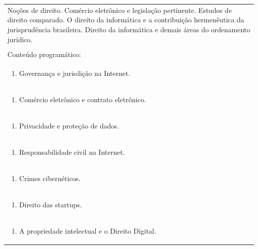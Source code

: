 \documentclass[11pt]{article}
\begin{document}
\begin{center}
\begin{longtable}{|p{4cm}|p{4cm}|p{4cm}|p{4cm}|}
\multicolumn{4}{|p{\dimexpr 16cm + 6\tabcolsep\relax}|}{Noções de direito. Comércio eletrônico e legislação pertinente. Estudos de direito comparado. O direito da informática e a contribuição hermenêutica da jurisprudência brasileira. Direito da informática e demais áreas do ordenamento jurídico.}\\
\multicolumn{4}{|p{16cm}|}{}\\
\hline
\multicolumn{4}{|p{16cm}|}{Conteúdo programático:}\\*
\multicolumn{4}{|p{\dimexpr 16cm + 6\tabcolsep\relax}|}{\begin{enumerate}[start=1]\item Governança e jurisdição na Internet.\end{enumerate}}\\
\multicolumn{4}{|p{\dimexpr 16cm + 6\tabcolsep\relax}|}{\begin{enumerate}[start=2]\item Comércio eletrônico e contrato eletrônico.\end{enumerate}}\\
\multicolumn{4}{|p{\dimexpr 16cm + 6\tabcolsep\relax}|}{\begin{enumerate}[start=3]\item Privacidade e proteção de dados.\end{enumerate}}\\
\multicolumn{4}{|p{\dimexpr 16cm + 6\tabcolsep\relax}|}{\begin{enumerate}[start=4]\item Responsabilidade civil na Internet.\end{enumerate}}\\
\multicolumn{4}{|p{\dimexpr 16cm + 6\tabcolsep\relax}|}{\begin{enumerate}[start=5]\item Crimes cibernéticos.\end{enumerate}}\\
\multicolumn{4}{|p{\dimexpr 16cm + 6\tabcolsep\relax}|}{\begin{enumerate}[start=6]\item Direito das startups.\end{enumerate}}\\
\multicolumn{4}{|p{\dimexpr 16cm + 6\tabcolsep\relax}|}{\begin{enumerate}[start=7]\item A propriedade intelectual e o Direito Digital.\end{enumerate}}\\

\end{longtable}
\end{center}
\end{document}
